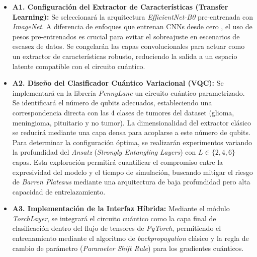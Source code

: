 \documentclass[12pt,letterpaper]{article}
\begin{document}
    \begin{itemize}
        \item \textbf{A1. Configuración del Extractor de Características (Transfer Learning):} Se seleccionará la arquitectura \textit{EfficientNet-B0} pre-entrenada con \textit{ImageNet}. A diferencia de enfoques que entrenan CNNs desde cero \citep{haddou2025hqcm}, el uso de pesos pre-entrenados es crucial para evitar el sobreajuste en escenarios de escasez de datos. Se congelarán las capas convolucionales para actuar como un extractor de características robusto, reduciendo la salida a un espacio latente compatible con el circuito cuántico.        

        \item \textbf{A2. Diseño del Clasificador Cuántico Variacional (VQC):} Se implementará en la librería \textit{PennyLane} un circuito cuántico parametrizado. Se identificará el número de qubits adecuados, estableciendo una correspondencia directa con las 4 clases de tumores del dataset (glioma, meningioma, pituitario y no tumor). La dimensionalidad del extractor clásico se reducirá mediante una capa densa para acoplarse a este número de qubits. Para determinar la configuración óptima, se realizarán experimentos variando la profundidad del \textit{Ansatz} (\textit{Strongly Entangling Layers}) con $L \in \{2, 4, 6\}$ capas. Esta exploración permitirá cuantificar el compromiso entre la expresividad del modelo y el tiempo de simulación, buscando mitigar el riesgo de \textit{Barren Plateaus} mediante una arquitectura de baja profundidad pero alta capacidad de entrelazamiento.
        
        \item \textbf{A3. Implementación de la Interfaz Híbrida:} Mediante el módulo \textit{TorchLayer}, se integrará el circuito cuántico como la capa final de clasificación dentro del flujo de tensores de \textit{PyTorch}, permitiendo el entrenamiento mediante el algoritmo de \textit{backpropagation} clásico y la regla de cambio de parámetro (\textit{Parameter Shift Rule}) para los gradientes cuánticos.
    \end{itemize}
    
\end{document}
